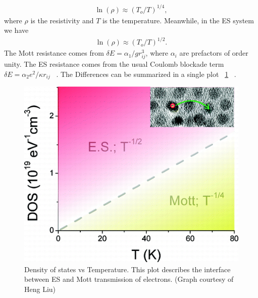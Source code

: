 \begin{eqnarray}
\ln(\rho) \approx (T_o / T)^{1/4} ,
\label{fourth}
\end{eqnarray}
where $\rho$ is the resistivity and $T$ is the temperature. Meanwhile, in the ES system we have
\begin{eqnarray}
\ln(\rho) \approx (T_o / T)^{1/2}.
\label{half}
\end{eqnarray}
The Mott resistance comes from $\delta E = \alpha_1 / g r_{ij}^3 $, where $\alpha_i$ are prefactors of order unity. The ES resistance comes from the usual Coulomb blockade term $\delta E = \alpha_2 e^2 / \kappa r_{ij}$ ~\cite{aharony92}. The Differences can be summarized in a single plot ~\ref{MvsES} ~\cite{Liu10}.

\begin{figure}[htbp]
\begin{center}
\includegraphics[scale=.50]{MottvsES.png}
\caption{Density of states vs Temperature. This plot describes the interface between ES and Mott transmission of electrons. (Graph courtesy of Heng Liu)}
\label{MvsES}
\end{center}
\end{figure}

